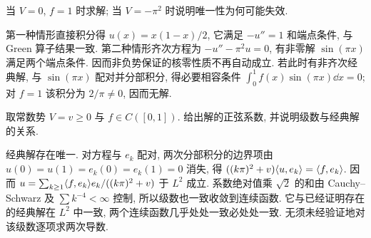 \begin{example}\label{legacy:ch12:example1}
当 $V=0$, $f=1$ 时求解; 当 $V=-\pi^2$ 时说明唯一性为何可能失效.
\end{example}
\begin{solution}
第一种情形直接积分得 $u(x)=x(1-x)/2$, 它满足 $-u''=1$ 和端点条件, 与 Green 算子结果一致. 第二种情形齐次方程为 $-u''-\pi^2u=0$, 有非零解 $\sin(\pi x)$ 满足两个端点条件. 因而非负势保证的核零性质不再自动成立. 若此时有非齐次经典解, 与 $\sin(\pi x)$ 配对并分部积分, 得必要相容条件 $\int_0^1f(x)\sin(\pi x)\dd x=0$; 对 $f=1$ 该积分为 $2/\pi\ne0$, 因而无解.
\end{solution}

\begin{exercise}\label{legacy:ch12:exercise1}
取常数势 $V=v\ge0$ 与 $f\in C([0,1])$. 给出解的正弦系数, 并说明级数与经典解的关系.
\end{exercise}
\begin{solution}
经典解存在唯一. 对方程与 $e_k$ 配对, 两次分部积分的边界项由 $u(0)=u(1)=e_k(0)=e_k(1)=0$ 消失, 得 $((k\pi)^2+v)\langle u,e_k\rangle=\langle f,e_k\rangle$. 因而
$u=\sum_{k\ge1}\langle f,e_k\rangle e_k/((k\pi)^2+v)$ 于 $L^2$ 成立. 系数绝对值乘 $\sqrt2$ 的和由 Cauchy--Schwarz 及 $\sum k^{-4}<\infty$ 控制, 所以级数也一致收敛到连续函数. 它与已经证明存在的经典解在 $L^2$ 中一致, 两个连续函数几乎处处一致必处处一致. 无须未经验证地对该级数逐项求两次导数.
\end{solution}
